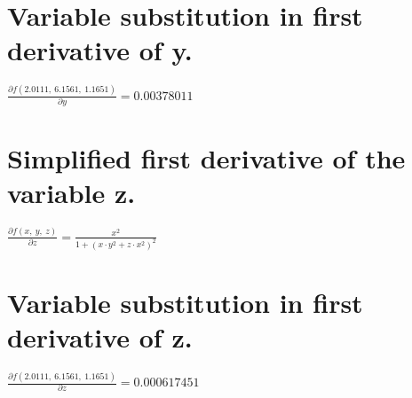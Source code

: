 \documentclass{article}
\begin{document}
\section{Variable substitution in first derivative of y.}
$\frac{\partial f(2.0111,\ 6.1561,\ 1.1651)}{\partial y} = 0.00378011$

\section{Simplified first derivative of the variable z.}
$\frac{\partial f(x,\ y,\ z)}{\partial z} = \frac{x^{2}}{1 + (x \cdot y^{2} + z \cdot x^{2})^{2}}$

\section{Variable substitution in first derivative of z.}
$\frac{\partial f(2.0111,\ 6.1561,\ 1.1651)}{\partial z} = 0.000617451$
\end{document}
